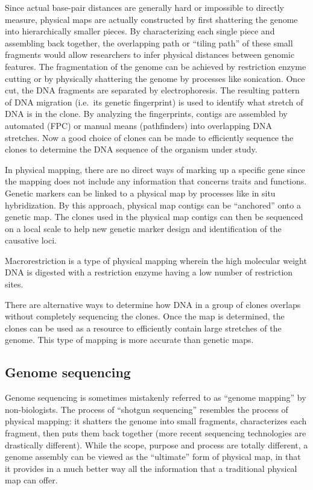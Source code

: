Since actual base-pair distances are generally hard or impossible to directly measure, physical maps are actually constructed by first shattering the genome into hierarchically smaller pieces. By characterizing each single piece and assembling back together, the overlapping path or ``tiling path'' of these small fragments would allow researchers to infer physical distances between genomic features. The fragmentation of the genome can be achieved by restriction enzyme cutting or by physically shattering the genome by processes like sonication. Once cut, the DNA fragments are separated by electrophoresis. The resulting pattern of DNA migration (i.e.~its genetic fingerprint) is used to identify what stretch of DNA is in the clone. By analyzing the fingerprints, contigs are assembled by automated (FPC) or manual means (pathfinders) into overlapping DNA stretches. Now a good choice of clones can be made to efficiently sequence the clones to determine the DNA sequence of the organism under study.

In physical mapping, there are no direct ways of marking up a specific gene since the mapping does not include any information that concerns traits and functions. Genetic markers can be linked to a physical map by processes like in situ hybridization. By this approach, physical map contigs can be ``anchored'' onto a genetic map. The clones used in the physical map contigs can then be sequenced on a local scale to help new genetic marker design and identification of the causative loci.

Macrorestriction is a type of physical mapping wherein the high molecular weight DNA is digested with a restriction enzyme having a low number of restriction sites.

There are alternative ways to determine how DNA in a group of clones overlaps without completely sequencing the clones. Once the map is determined, the clones can be used as a resource to efficiently contain large stretches of the genome. This type of mapping is more accurate than genetic maps.

\hypertarget{genome-sequencing}{%
\subsection{Genome sequencing}\label{genome-sequencing}}

Genome sequencing is sometimes mistakenly referred to as ``genome mapping'' by non-biologists. The process of ``shotgun sequencing'' resembles the process of physical mapping: it shatters the genome into small fragments, characterizes each fragment, then puts them back together (more recent sequencing technologies are drastically different). While the scope, purpose and process are totally different, a genome assembly can be viewed as the ``ultimate'' form of physical map, in that it provides in a much better way all the information that a traditional physical map can offer.

